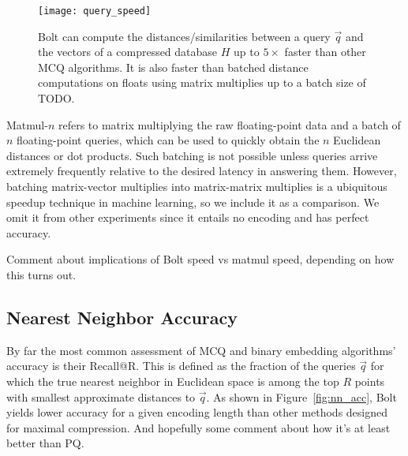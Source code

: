 \begin{figure}[h]
\begin{center}
\label{fig:query_speeds}
\texttt{[image: query\_speed]}
\caption{Bolt can compute the distances/similarities between a query $\vec{q}$ and the vectors of a compressed database $H$ up to $5\times$ faster than other MCQ algorithms. It is also faster than batched distance computations on floats using matrix multiplies up to a batch size of TODO.}
\end{center}
\end{figure}

Matmul-$n$ refers to matrix multiplying the raw floating-point data and a batch of $n$ floating-point queries, which can be used to quickly obtain the $n$ Euclidean distances or dot products. Such batching is not possible unless queries arrive extremely frequently relative to the desired latency in answering them. However, batching matrix-vector multiplies into matrix-matrix multiplies is a ubiquitous speedup technique in machine learning, so we include it as a comparison. We omit it from other experiments since it entails no encoding and has perfect accuracy.

Comment about implications of Bolt speed vs matmul speed, depending on how this turns out.





\subsection{Nearest Neighbor Accuracy}

By far the most common assessment of MCQ and binary embedding algorithms' accuracy is their Recall@R. This is defined as the fraction of the queries $\vec{q}$ for which the true nearest neighbor in Euclidean space is among the top $R$ points with smallest approximate distances to $\vec{q}$. As shown in Figure~\ref{fig:nn_acc}, Bolt yields lower accuracy for a given encoding length than other methods designed for maximal compression. And hopefully some comment about how it's at least better than PQ.

